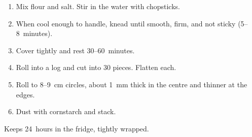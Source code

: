 
\begin{ingredients}
\end{ingredients}


\begin{recipe}
  \begin{enumerate}

  \item Mix flour and salt.  Stir in the water with chopsticks.

  \item When cool enough to handle, knead until smooth, firm, and not
    sticky (5--8~minutes).

  \item Cover tightly and rest 30--60~minutes.

  \item Roll into a log and cut into 30 pieces.  Flatten each.

  \item Roll to 8--9~cm circles, about 1~mm thick in the centre and
    thinner at the edges.

  \item Dust with cornstarch and stack.

  \end{enumerate}
\end{recipe}

\notes Keeps 24~hours in the fridge, tightly wrapped.

